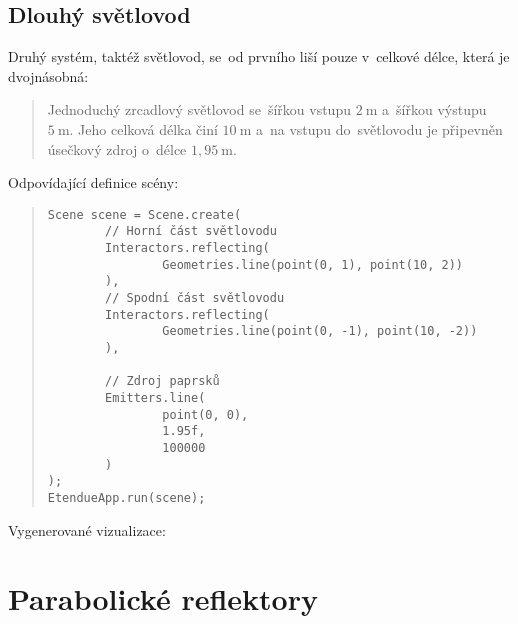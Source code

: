
\beautypage

\subsection{Dlouhý světlovod}

Druhý systém, taktéž světlovod, se~od prvního liší pouze v~celkové délce, která je dvojnásobná:

\begin{quote}
    Jednoduchý zrcadlový světlovod se~šířkou vstupu $2\ \mathrm{m}$ a~šířkou výstupu $5\ \mathrm{m}$. Jeho celková délka činí $10\ \mathrm{m}$ a~na vstupu do~světlovodu je připevněn úsečkový zdroj o~délce $1,95\ \mathrm{m}$.
\end{quote}

Odpovídající definice scény:

\begin{minipage}{\textwidth}\begin{quote}\begin{lstlisting}
Scene scene = Scene.create(
        // Horní část světlovodu
        Interactors.reflecting(
                Geometries.line(point(0, 1), point(10, 2))
        ),
        // Spodní část světlovodu
        Interactors.reflecting(
                Geometries.line(point(0, -1), point(10, -2))
        ),

        // Zdroj paprsků
        Emitters.line(
                point(0, 0),
                1.95f,
                100000
        )
);
EtendueApp.run(scene);
\end{lstlisting}\end{quote}\end{minipage}

Vygenerované vizualizace:




\section{Parabolické reflektory}
\label{sec:parabolickereflektory}

